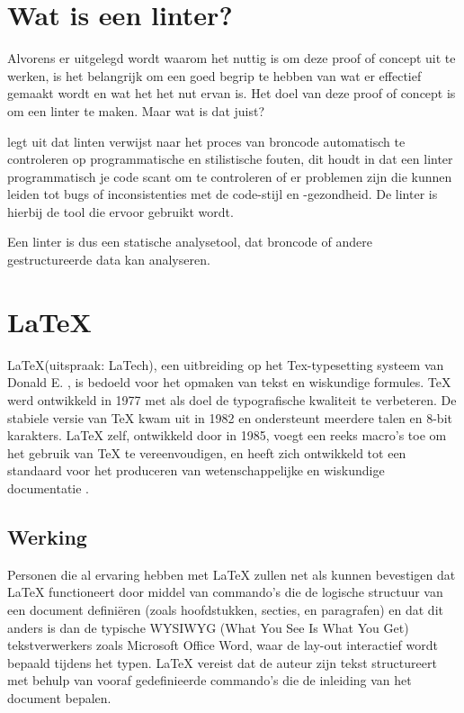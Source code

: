 \section{Wat is een linter?}
Alvorens er uitgelegd wordt waarom het nuttig is om deze proof of concept uit te werken, is het belangrijk om een goed begrip te hebben van wat er effectief gemaakt wordt en wat het het nut ervan is. Het doel van deze proof of concept is om een linter te maken. Maar wat is dat juist?

\textcite{Kamunya2023} legt uit dat linten verwijst naar het proces van broncode automatisch te controleren op programmatische en stilistische fouten, dit houdt in dat een linter programmatisch je code scant om te controleren of er problemen zijn die kunnen leiden tot bugs of inconsistenties met de code-stijl en -gezondheid. De linter is hierbij de tool die ervoor gebruikt wordt.

Een linter is dus een statische analysetool, dat broncode of andere gestructureerde data kan analyseren.

\section{\LaTeX}
\LaTeX (uitspraak: LaTech), een uitbreiding op het Tex-typesetting systeem van Donald E. \textcite{Knuth1984}, is bedoeld voor het opmaken van tekst en wiskundige formules. TeX werd ontwikkeld in 1977 met als doel de typografische kwaliteit te verbeteren. De stabiele versie van TeX kwam uit in 1982 en ondersteunt meerdere talen en 8-bit karakters. LaTeX zelf, ontwikkeld door \textcite{Lamport1994} in 1985, voegt een reeks macro's toe om het gebruik van TeX te vereenvoudigen, en heeft zich ontwikkeld tot een standaard voor het produceren van wetenschappelijke en wiskundige documentatie \autocite{Oetiker2023}. 

\subsection{Werking}
Personen die al ervaring hebben met LaTeX zullen net als \textcite{Oetiker2023} kunnen bevestigen dat LaTeX functioneert door middel van commando's die de logische structuur van een document definiëren (zoals hoofdstukken, secties, en paragrafen) en dat dit anders is dan de typische WYSIWYG (What You See Is What You Get) tekstverwerkers zoals Microsoft Office Word, waar de lay-out interactief wordt bepaald tijdens het typen. LaTeX vereist dat de auteur zijn tekst structureert met behulp van vooraf gedefinieerde commando's die de inleiding van het document bepalen. 

